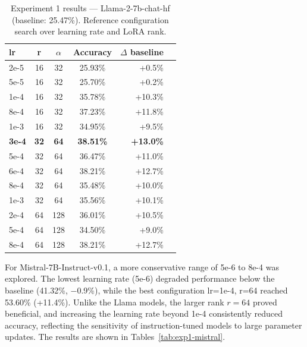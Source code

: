   \begin{table}[ht]
  \caption{Experiment 1 results --- Llama-2-7b-chat-hf (baseline: 25.47\%). Reference configuration search over learning rate and LoRA rank.}
  \centering
  \footnotesize
  \begin{tabular}{lcccrr}
  \toprule
  \textbf{lr} & \textbf{r} & \textbf{$\alpha$} & \textbf{Accuracy} & \textbf{$\Delta$ baseline} \\
  \midrule
  2e-5 & 16 & 32 & 25.93\% & +0.5\% \\
  5e-5 & 16 & 32 & 25.70\% & +0.2\% \\
  1e-4 & 16 & 32 & 35.78\% & +10.3\%\\
  8e-4 & 16 & 32 & 37.23\% & +11.8\% \\
  1e-3 & 16 & 32 & 34.95\% & +9.5\% \\
  \midrule
  \textbf{3e-4} & \textbf{32} & \textbf{64} & \textbf{38.51\%} & \textbf{+13.0\%} \\
  5e-4 & 32 & 64 & 36.47\% & +11.0\% \\
  6e-4 & 32 & 64 & 38.21\% & +12.7\% \\
  8e-4 & 32 & 64 & 35.48\% & +10.0\% \\
  1e-3 & 32 & 64 & 35.56\% & +10.1\% \\
  \midrule
  2e-4 & 64 & 128 & 36.01\% & +10.5\% \\
  5e-4 & 64 & 128 & 34.50\% & +9.0\% \\
  8e-4 & 64 & 128 & 38.21\% & +12.7\% \\
  \bottomrule
  \end{tabular}

  \label{tab:exp1-llama-chat}
  \end{table}

For Mistral-7B-Instruct-v0.1, a more conservative range of
  5e-6 to 8e-4 was explored. The lowest learning
  rate (5e-6) degraded performance below the baseline
  (41.32\%, $-$0.9\%), while the best configuration
  lr=1e-4, r=64 reached 53.60\% (+11.4\%). Unlike the Llama
  models, the larger rank $r=64$ proved beneficial, and increasing
  the learning rate beyond 1e-4 consistently reduced accuracy,
  reflecting the sensitivity of instruction-tuned models to large
  parameter updates. The results are shown in Tables~\ref{tab:exp1-mistral}.

